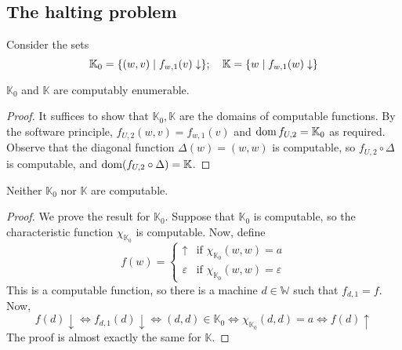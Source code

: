\subsection{The halting problem}
Consider the sets
\[ \mathbb K_0 = \qty{(w, v) \mid f_{w,1}(v) \downarrow};\quad \mathbb K = \qty{w \mid f_{w,1}(w) \downarrow} \]
\begin{theorem}
	\( \mathbb K_0 \) and \( \mathbb K \) are computably enumerable.
\end{theorem}
\begin{proof}
	It suffices to show that \( \mathbb K_0, \mathbb K \) are the domains of computable functions.
	By the software principle, \( f_{U,2}(w,v) = f_{w,1}(v) \) and \( \operatorname{dom} f_{U,2} = \mathbb K_0 \) as required.
	Observe that the diagonal function \( \Delta(w) = (w, w) \) is computable, so \( f_{U,2} \circ \Delta \) is computable, and \( \operatorname{dom}(f_{U,2} \circ \Delta) = \mathbb K \).
\end{proof}
\begin{theorem}
	Neither \( \mathbb K_0 \) nor \( \mathbb K \) are computable.
\end{theorem}
\begin{proof}
	We prove the result for \( \mathbb K_0 \).
	Suppose that \( \mathbb K_0 \) is computable, so the characteristic function \( \chi_{\mathbb K_0} \) is computable.
	Now, define
	\[ f(w) = \begin{cases}
		\uparrow & \text{if } \chi_{\mathbb K_0}(w,w) = a \\
		\varepsilon & \text{if } \chi_{\mathbb K_0}(w,w) = \varepsilon
	\end{cases} \]
	This is a computable function, so there is a machine \( d \in \mathbb W \) such that \( f_{d,1} = f \).
	Now,
	\[ f(d) \downarrow \iff f_{d,1}(d) \downarrow \iff (d,d) \in \mathbb K_0 \iff \chi_{\mathbb K_0}(d,d) = a \iff f(d) \uparrow \]
	The proof is almost exactly the same for \( \mathbb K \).
\end{proof}


